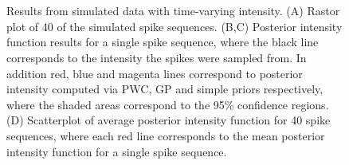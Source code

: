 \documentclass[../main.tex]{subfiles}
\begin{document}
\begin{figure}[t]
\hrulefill
\begin{center} 
 \qquad
{}  \\
 \qquad
{}  \\
\end{center}     
\caption{Results from simulated data with time-varying intensity. (A) Rastor plot of 40 of the simulated spike sequences. (B,C) Posterior intensity function results for a single spike sequence, where the black line corresponds to the intensity the spikes were sampled from. In addition red, blue and magenta lines correspond to posterior intensity computed via PWC, GP and simple priors respectively, where the shaded areas correspond to the 95\% confidence regions.  (D) Scatterplot of average posterior intensity function for 40 spike sequences, where each red line corresponds to the mean posterior intensity function for a single spike sequence.      }
\hrulefill
\label{fig:ResultsEx}
\end{figure}




















\end{document}
